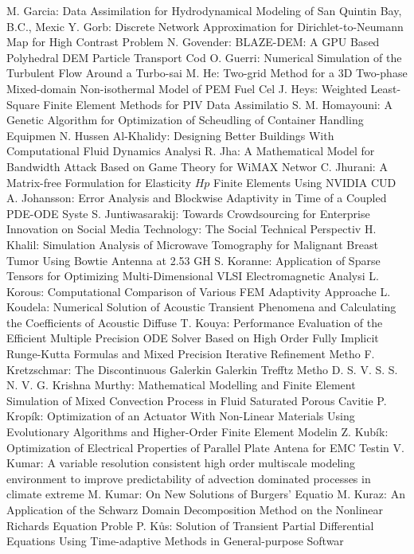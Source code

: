 \documentclass[10pt, A4]{article}%
\begin{document}
{M. Garcia}: {Data Assimilation for Hydrodynamical Modeling of San Quintin Bay, B.C., Mexic}
{Y. Gorb}: {Discrete Network Approximation for Dirichlet-to-Neumann Map for High Contrast Problem}
{N. Govender}: {BLAZE-DEM: A GPU Based Polyhedral DEM Particle Transport Cod}
{O. Guerri}: {Numerical Simulation of the Turbulent Flow Around a Turbo-sai}
{M. He}: {Two-grid Method for a 3D Two-phase Mixed-domain Non-isothermal Model of PEM Fuel Cel}
{J. Heys}: {Weighted Least-Square Finite Element Methods for PIV Data Assimilatio}
{S. M. Homayouni}: {A Genetic Algorithm for Optimization of Scheudling of Container Handling Equipmen}
{N. Hussen Al-Khalidy}: {Designing Better Buildings With Computational Fluid Dynamics Analysi}
{R. Jha}: {A Mathematical Model for Bandwidth Attack Based on Game Theory for WiMAX Networ}
{C. Jhurani}: {A Matrix-free Formulation for Elasticity $Hp$ Finite Elements Using NVIDIA CUD}
{A. Johansson}: {Error Analysis and Blockwise Adaptivity in Time of a Coupled PDE-ODE Syste}
{S. Juntiwasarakij}: {Towards Crowdsourcing for Enterprise Innovation on Social Media Technology: The Social Technical Perspectiv}
{H. Khalil}: {Simulation Analysis of Microwave Tomography for Malignant Breast Tumor Using Bowtie Antenna at 2.53 GH}
{S. Koranne}: {Application of Sparse Tensors for Optimizing Multi-Dimensional VLSI Electromagnetic Analysi}
{L. Korous}: {Computational Comparison of Various FEM Adaptivity Approache}
{L. Koudela}: {Numerical Solution of Acoustic Transient Phenomena and Calculating the Coefficients of Acoustic Diffuse}
{T. Kouya}: {Performance Evaluation of the Efficient Multiple Precision ODE Solver Based on High Order Fully Implicit Runge-Kutta Formulas and Mixed Precision Iterative Refinement Metho}
{F. Kretzschmar}: {The Discontinuous Galerkin Galerkin Trefftz Metho}
{D. S. V. S. S. N. V. G. Krishna Murthy}: {Mathematical Modelling and Finite Element Simulation of Mixed Convection Process in Fluid Saturated Porous Cavitie}
{P. Kropík}: {Optimization of an Actuator With Non-Linear Materials Using Evolutionary Algorithms and Higher-Order Finite Element Modelin}
{Z. Kubík}: {Optimization of Electrical Properties of Parallel Plate Antena for EMC Testin}
{V. Kumar}: {A variable resolution consistent high order multiscale modeling environment to improve predictability of advection dominated processes in climate extreme}
{M. Kumar}: {On New Solutions of Burgers' Equatio}
{M. Kuraz}: {An Application of the Schwarz Domain Decomposition Method on the Nonlinear Richards Equation Proble}
{P. Kůs}: {Solution of Transient Partial Differential Equations Using Time-adaptive Methods in General-purpose Softwar}
\end{document}
